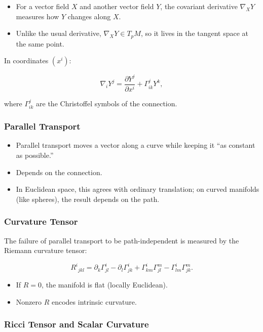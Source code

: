 \documentclass[
  letterpaper,
  DIV=11,
  numbers=noendperiod]{scrreprt}
\providecommand{\tightlist}{%
  \setlength{\itemsep}{0pt}\setlength{\parskip}{0pt}}
\begin{document}
\begin{itemize}
\tightlist
\item
  For a vector field \(X\) and another vector field \(Y\), the covariant
  derivative \(\nabla_X Y\) measures how \(Y\) changes along \(X\).
\item
  Unlike the usual derivative, \(\nabla_X Y \in T_p M\), so it lives in
  the tangent space at the same point.
\end{itemize}

In coordinates \((x^i)\):

\[
\nabla_i Y^j = \frac{\partial Y^j}{\partial x^i} + \Gamma^j_{ik} Y^k,
\]

where \(\Gamma^j_{ik}\) are the Christoffel symbols of the connection.

\subsubsection{Parallel Transport}\label{parallel-transport}

\begin{itemize}
\tightlist
\item
  Parallel transport moves a vector along a curve while keeping it ``as
  constant as possible.''
\item
  Depends on the connection.
\item
  In Euclidean space, this agrees with ordinary translation; on curved
  manifolds (like spheres), the result depends on the path.
\end{itemize}

\subsubsection{Curvature Tensor}\label{curvature-tensor}

The failure of parallel transport to be path-independent is measured by
the Riemann curvature tensor:

\[
R^i{}_{jkl} = \partial_k \Gamma^i_{jl} - \partial_l \Gamma^i_{jk}
+ \Gamma^i_{km} \Gamma^m_{jl} - \Gamma^i_{lm} \Gamma^m_{jk}.
\]

\begin{itemize}
\tightlist
\item
  If \(R=0\), the manifold is flat (locally Euclidean).
\item
  Nonzero \(R\) encodes intrinsic curvature.
\end{itemize}

\subsubsection{Ricci Tensor and Scalar
Curvature}\label{ricci-tensor-and-scalar-curvature}
\end{document}
